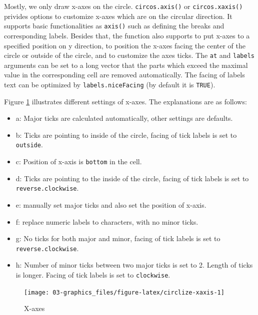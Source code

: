 \documentclass[]{book}
\providecommand{\tightlist}{%
  \setlength{\itemsep}{0pt}\setlength{\parskip}{0pt}}
\theoremstyle{definition}
\theoremstyle{definition}
\theoremstyle{remark}
\begin{document}
Mostly, we only draw x-axes on the circle. \texttt{circos.axis()} or
\texttt{circos.xaxis()} privides options to customize x-axes which are
on the circular direction. It supports basic functionalities as
\texttt{axis()} such as defining the breaks and corresponding labels.
Besides that, the function also supports to put x-axes to a specified
position on y direction, to position the x-axes facing the center of the
circle or outside of the circle, and to customize the axes ticks. The
\texttt{at} and \texttt{labels} arguments can be set to a long vector
that the parts which exceed the maximal value in the corresponding cell
are removed automatically. The facing of labels text can be optimized by
\texttt{labels.niceFacing} (by default it is \texttt{TRUE}).

Figure \ref{fig:circlize-xaxis} illustrates different settings of
x-axes. The explanations are as follows:

\begin{itemize}
\tightlist
\item
  a: Major ticks are calculated automatically, other settings are
  defaults.
\item
  b: Ticks are pointing to inside of the circle, facing of tick labels
  is set to \texttt{outside}.
\item
  c: Position of x-axis is \texttt{bottom} in the cell.
\item
  d: Ticks are pointing to the inside of the circle, facing of tick
  labels is set to \texttt{reverse.clockwise}.
\item
  e: manually set major ticks and also set the position of x-axis.
\item
  f: replace numeric labels to characters, with no minor ticks.
\item
  g: No ticks for both major and minor, facing of tick labels is set to
  \texttt{reverse.clockwise}.
\item
  h: Number of minor ticks between two major ticks is set to 2. Length
  of ticks is longer. Facing of tick labels is set to
  \texttt{clockwise}.
\end{itemize}

\begin{figure}

{\centering \texttt{[image: 03-graphics\_files/figure-latex/circlize-xaxis-1]} 

}

\caption{X-axes}\label{fig:circlize-xaxis}
\end{figure}
\end{document}
